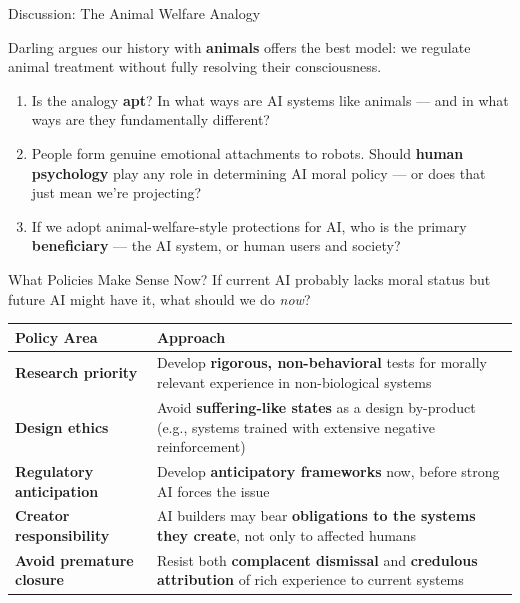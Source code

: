 \documentclass[aspectratio=169,11pt]{beamer}
\begin{document}
\begin{frame}{Discussion: The Animal Welfare Analogy}
\begin{discussionbox}[Discussion]
\small
Darling argues our history with \textbf{animals} offers the best model: we regulate animal treatment without fully resolving their consciousness.
\begin{enumerate}
    \item Is the analogy \textbf{apt}? In what ways are AI systems like animals --- and in what ways are they fundamentally different?
    \item People form genuine emotional attachments to robots. Should \textbf{human psychology} play any role in determining AI moral policy --- or does that just mean we're projecting?
    \item If we adopt animal-welfare-style protections for AI, who is the primary \textbf{beneficiary} --- the AI system, or human users and society?
\end{enumerate}
\end{discussionbox}
\end{frame}

\begin{frame}[shrink=5]{What Policies Make Sense Now?}
If current AI probably lacks moral status but future AI might have it, what should we do \emph{now}?

\vspace{0.15cm}
\begin{tabular}{@{}p{3.8cm}p{7.8cm}@{}}
\toprule
\textbf{Policy Area} & \textbf{Approach} \\
\midrule
\textbf{Research priority} & Develop \textbf{rigorous, non-behavioral} tests for morally relevant experience in non-biological systems \\
\addlinespace
\textbf{Design ethics} & Avoid \textbf{suffering-like states} as a design by-product (e.g., systems trained with extensive negative reinforcement) \\
\addlinespace
\textbf{Regulatory anticipation} & Develop \textbf{anticipatory frameworks} now, before strong AI forces the issue \\
\addlinespace
\textbf{Creator responsibility} & AI builders may bear \textbf{obligations to the systems they create}, not only to affected humans \\
\addlinespace
\textbf{Avoid premature closure} & Resist both \textbf{complacent dismissal} and \textbf{credulous attribution} of rich experience to current systems \\
\bottomrule
\end{tabular}
\end{frame}
\end{document}
